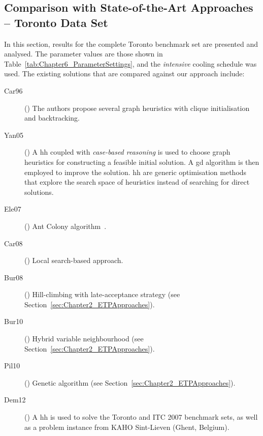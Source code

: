 


%
%
\subsection{Comparison with State-of-the-Art Approaches -- Toronto Data Set}
\label{sec:ComparisonToronto}

In this section, results for the complete Toronto benchmark set are presented and analysed. The parameter values are those shown in Table~\ref{tab:Chapter6_ParameterSettings}, and the \textit{intensive} cooling schedule was used. The existing solutions that are compared against our approach include:
\begin{description}
	\item[Car96] (\cite{Carter_Laporte_Lee_1996}) The authors propose several graph heuristics with clique initialisation and backtracking. 
	
	\item[Yan05] (\cite{Yang2005}) A \gls{hh} coupled with \textit{case-based reasoning} is used to choose graph heuristics for constructing a feasible initial solution. A \gls{gd} algorithm is then employed to improve the solution. \gls{hh} are generic optimisation methods that explore the search space of heuristics instead of searching for direct solutions.
	
	\item[Ele07] (\cite{Eley2007}) Ant Colony algorithm~\citep{Dorigo2010}.	
	
	\item[Car08] (\cite{Caramia2008}) Local search-based approach.
	
	\item[Bur08] (\cite{Burke2008}) Hill-climbing with late-acceptance strategy (see Section~\ref{sec:Chapter2_ETPApproaches}).
	
	\item[Bur10] (\cite{Burke2010}) Hybrid variable neighbourhood (see Section~\ref{sec:Chapter2_ETPApproaches}).	
	
	\item[Pil10] (\cite{Pillay2010}) Genetic algorithm (see Section~\ref{sec:Chapter2_ETPApproaches}).
	
	\item[Dem12] (\cite{Demeester2012}) A \gls{hh} is used to solve the Toronto and ITC 2007 benchmark sets, as well as a problem instance from KAHO Sint-Lieven (Ghent, Belgium). 	
	

\end{description}
